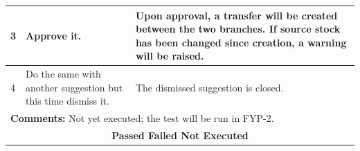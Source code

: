 \documentclass{StockSense}
\begin{document}
\begin{table}[!htbp]
{\begin{tabular}{|p{}|p{}|p{}|p{}|}
3 & Approve it. & \multicolumn{2}{p{\dimexpr0.42\textwidth+2\tabcolsep\relax}|}{Upon approval, a transfer will be created between the two branches. If source stock has been changed since creation, a warning will be raised.} \\ \hline
4 & Do the same with another suggestion but this time dismiss it. & \multicolumn{2}{p{\dimexpr0.42\textwidth+2\tabcolsep\relax}|}{The dismissed suggestion is closed.} \\ \hline
\multicolumn{4}{|l|}{\textbf{Comments:} Not yet executed; the test will be run in FYP-2.} \\ \hline
\multicolumn{4}{|c|}{\textbf{Passed \quad Failed \quad Not Executed}} \\ \hline
\end{tabular}\par}
\end{table}
\end{document}
